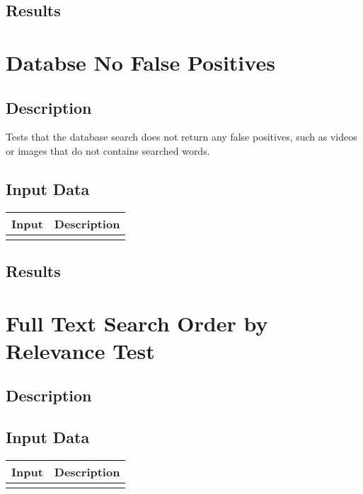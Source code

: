 \documentclass{scrreprt}
\begin{document}
\subsection{Results}

\section{Databse No False Positives}
\subsection{Description}
\begin{flushleft}
Tests that the database search does not return any false positives, such as videos or images that do not contains searched words.
\end{flushleft}
\subsection{Input Data}
 \centering
 \begin{tabular}{p{3cm}p{6cm}}
 \hline\hline
 Input & Description\\
 \hline\hline
   &  \\ %
 \hline
 \end{tabular}
\subsection{Results}

\section{Full Text Search Order by Relevance Test}
\subsection{Description}
\begin{flushleft}
\end{flushleft}
\subsection{Input Data}
 \centering
 \begin{tabular}{p{3cm}p{6cm}}
 \hline\hline
 Input & Description\\
 \hline\hline
   &  \\ %
 \hline
 \end{tabular}
\end{document}
